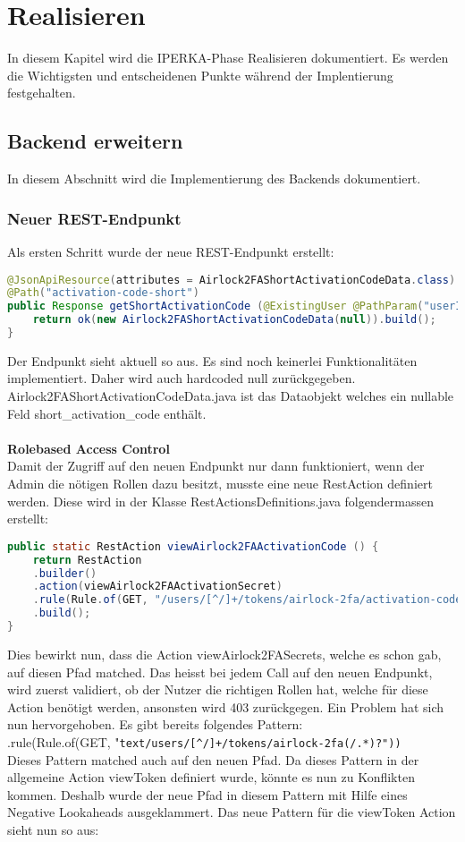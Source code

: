 \chapter{Realisieren}\label{ch:realisieren}
In diesem Kapitel wird die IPERKA-Phase Realisieren dokumentiert. Es werden die Wichtigsten und entscheidenen Punkte während der Implentierung festgehalten. 

\section{Backend erweitern}
In diesem Abschnitt wird die Implementierung des Backends dokumentiert. 
\subsection{Neuer REST-Endpunkt}
Als ersten Schritt wurde der neue REST-Endpunkt erstellt:
\begin{lstlisting}[language=Java]
	@JsonApiResource(attributes = Airlock2FAShortActivationCodeData.class)
@Path("activation-code-short")
public Response getShortActivationCode (@ExistingUser @PathParam("userId") @Parameter(schema = @Schema(type = "string")) UserParam userParam) {
	return ok(new Airlock2FAShortActivationCodeData(null)).build();
}
\end{lstlisting}
Der Endpunkt sieht aktuell so aus. Es sind noch keinerlei Funktionalitäten implementiert. Daher wird auch hardcoded null zurückgegeben. Airlock2FAShortActivationCodeData.java ist das Dataobjekt welches ein nullable Feld \flqq short\_activation\_code\frqq{} enthält. \\
\\
\textbf{Rolebased Access Control}\\
Damit der Zugriff auf den neuen Endpunkt nur dann funktioniert, wenn der Admin die nötigen Rollen dazu besitzt, musste eine neue RestAction definiert werden. Diese wird in der Klasse RestActionsDefinitions.java folgendermassen erstellt:
\begin{lstlisting}[language=Java]
	public static RestAction viewAirlock2FAActivationCode () {
	return RestAction
	.builder()
	.action(viewAirlock2FAActivationSecret)
	.rule(Rule.of(GET, "/users/[^/]+/tokens/airlock-2fa/activation-code-short"))
	.build();
}
\end{lstlisting}
Dies bewirkt nun, dass die Action \flqq viewAirlock2FASecrets\frqq{}, welche es schon gab, auf diesen Pfad matched. Das heisst bei jedem Call auf den neuen Endpunkt, wird zuerst validiert, ob der Nutzer die richtigen Rollen hat, welche für diese Action benötigt werden, ansonsten wird 403 zurückgegen.
Ein Problem hat sich nun hervorgehoben. Es gibt bereits folgendes Pattern:\\
 \flqq .rule(Rule.of(GET, "\verb*|text/users/[^/]+/tokens/airlock-2fa(/.*)?"))|\frqq{}
\\
Dieses Pattern matched auch auf den neuen Pfad. Da dieses Pattern in der allgemeine Action \flqq viewToken \frqq{} definiert wurde, könnte es nun zu Konflikten kommen. Deshalb wurde der neue Pfad in diesem Pattern mit Hilfe eines Negative Lookaheads ausgeklammert. Das neue Pattern für die viewToken Action sieht nun so aus:\\


